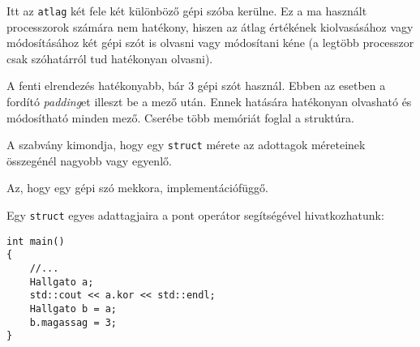 \documentclass[a4paper,11.5pt,table]{article}
\begin{document}
  Itt az \texttt{atlag} két fele két különböző gépi szóba kerülne. Ez a ma használt processzorok számára nem hatékony, hiszen az átlag értékének kiolvasásához vagy módosításához két gépi szót is olvasni vagy módosítani kéne (a legtöbb processzor csak szóhatárról tud hatékonyan olvasni).
	\begin{figure}[H]
		\centering
	\end{figure}
	A fenti elrendezés hatékonyabb, bár 3 gépi szót használ. Ebben az esetben a fordító \textit{padding}et illeszt be a mező után. Ennek hatására hatékonyan olvasható és módosítható minden mező. Cserébe több memóriát foglal a struktúra.
	\smallskip
	
	A szabvány kimondja, hogy egy \texttt{struct} mérete az adottagok méreteinek összegénél nagyobb vagy egyenlő.
	\smallskip
	
	Az, hogy egy gépi szó mekkora, implementációfüggő.
	\bigskip
	
	Egy \texttt{struct} egyes adattagjaira a pont operátor segítségével hivatkozhatunk:
	\begin{lstlisting}
int main()
{
	//...
	Hallgato a;
	std::cout << a.kor << std::endl;
	Hallgato b = a;
	b.magassag = 3;
}
	\end{lstlisting}      
	
\end{document}
